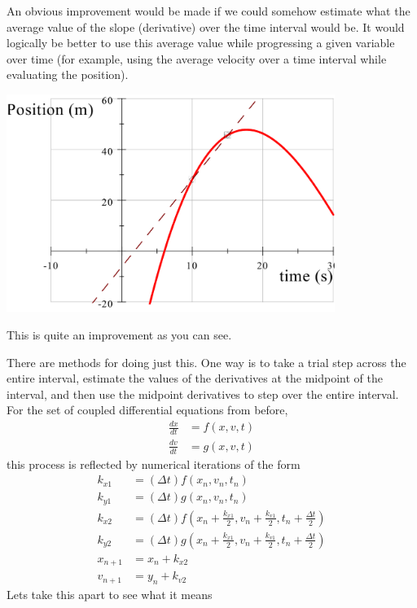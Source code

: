 \documentclass[twoside,11pt,ShortChapTitles]{BYUTextbook}
\begin{document}
An obvious improvement would be made if we could somehow estimate what the
average value of the slope (derivative) over the time interval would be. It
would logically be better to use this average value while progressing a given
variable over time (for example, using the average velocity over a time
interval while evaluating the position).
\begin{center}
\includegraphics[width=0.8\textwidth]{Lab7_figs/Parab2Points.png}
\end{center}
This is quite an improvement as you can see.

There are methods for doing just this. One way is to take a trial step across
the entire interval, estimate the values of the derivatives at the midpoint of
the interval, and then use the midpoint derivatives to step over the entire
interval. For the set of coupled differential equations from before,
\begin{align*}
\frac{dx}{dt}  & =f(x,v,t)\\
\frac{dv}{dt}  & =g(x,v,t)
\end{align*}
this process is reflected by numerical iterations of the form
\begin{align*}
k_{x1}  & =(\Delta t)f(x_{n},v_{n},t_{n})\\
k_{y1}  & =(\Delta t)g(x_{n},v_{n},t_{n})\\
k_{x2}  & =(\Delta t)f\left(  x_{n}+\frac{k_{x1}}{2},v_{n}+\frac{k_{v1}} {2},t_{n}+\frac{\Delta t}{2}\right) \\
k_{y2}  & =(\Delta t)g\left(  x_{n}+\frac{k_{x1}}{2},v_{n}+\frac{k_{v1}} {2},t_{n}+\frac{\Delta t}{2}\right) \\
x_{n+1}  & =x_{n}+k_{x2}\\
v_{n+1}  & =y_{n}+k_{v2} 
\end{align*}
Lets take this apart to see what it means
\end{document}
